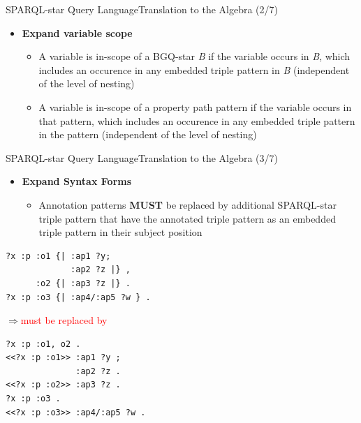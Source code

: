 \documentclass[aspectratio=169]{beamer}
\begin{document}
\begin{frame}{SPARQL-star Query Language}{Translation to the Algebra (2/7)}
    \begin{itemize}
        \item \textbf{Expand variable scope}
            \begin{itemize}
                \item A variable is in-scope of a BGQ-star \textit{B} if the variable occurs in \textit{B}, which includes an occurence in any embedded triple pattern in \textit{B} (independent of the level of nesting)
                \item A variable is in-scope of a property path pattern if the variable occurs in that pattern, which includes an occurence in any embedded triple pattern in the pattern (independent of the level of nesting)
            \end{itemize}
    \end{itemize}
\end{frame}

\begin{frame}[fragile]{SPARQL-star Query Language}{Translation to the Algebra (3/7)}
    \begin{itemize}
        \item \textbf{Expand Syntax Forms}
            \begin{itemize}
                \item Annotation patterns \textbf{MUST} be replaced by additional SPARQL-star triple pattern that have the annotated triple pattern as an embedded triple pattern in their subject position
            \end{itemize}
    \end{itemize}
    \begin{lstlisting}[language=TTL]
?x :p :o1 {| :ap1 ?y;
             :ap2 ?z |} ,
      :o2 {| :ap3 ?z |} .
?x :p :o3 {| :ap4/:ap5 ?w } .
    \end{lstlisting}
    $\Rightarrow$\textcolor{red}{must be replaced by}
    \begin{lstlisting}[language=TTL ]
?x :p :o1, o2 .
<<?x :p :o1>> :ap1 ?y ;
              :ap2 ?z .
<<?x :p :o2>> :ap3 ?z .
?x :p :o3 .
<<?x :p :o3>> :ap4/:ap5 ?w .
    \end{lstlisting}
\end{frame}
\end{document}
